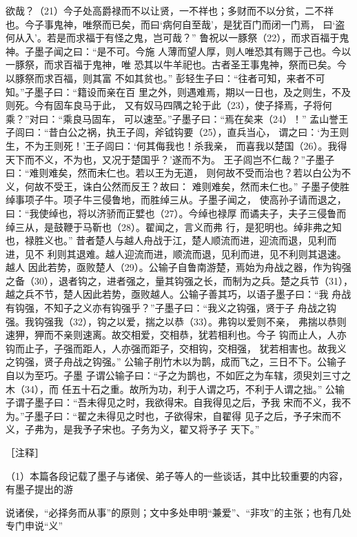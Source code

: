 \documentclass[12pt,UTF8]{ctexbook}
\begin{document}
欲哉？（21）今子处高爵禄而不以让贤，一不祥也；多财而不以分贫，二不祥 
也。今子事鬼神，唯祭而已矣，而曰‘病何自至哉’，是犹百门而闭一门焉， 
曰‘盗何从入’。若是而求福于有怪之鬼，岂可哉？” 
鲁祝以一豚祭（22），而求百福于鬼神。子墨子闻之曰：“是不可。今施 
人薄而望人厚，则人唯恐其有赐于己也。今以一豚祭，而求百福于鬼神，唯 
恐其以牛羊祀也。古者圣王事鬼神，祭而已矣。今以豚祭而求百福，则其富 
不如其贫也。” 
彭轻生子曰：“往者可知，来者不可知。”子墨子曰：“籍设而亲在百 
里之外，则遇难焉，期以一日也，及之则生，不及则死。今有固车良马于此， 
又有奴马四隅之轮于此（23），使子择焉，子将何乘？”对曰：“乘良马固车， 
可以速至。”子墨子曰：“焉在矣来（24）！” 
孟山誉王子闾曰：“昔白公之祸，执王子闾，斧钺钩要（25），直兵当心， 
谓之曰：‘为王则生，不为王则死！’王子闾曰：‘何其侮我也！杀我亲， 
而喜我以楚国（26）。我得天下而不义，不为也，又况于楚国乎？’遂而不为。 
王子闾岂不仁哉？”子墨子曰：“难则难矣，然而未仁也。若以王为无道， 
则何故不受而治也？若以白公为不义，何故不受王，诛白公然而反王？故曰： 
难则难矣，然而未仁也。” 
子墨子使胜绰事项子牛。项子牛三侵鲁地，而胜绰三从。子墨子闻之， 
使高孙子请而退之，曰：“我使绰也，将以济骄而正嬖也（27）。今绰也禄厚 
而谲夫子，夫子三侵鲁而绰三从，是鼓鞭于马靳也（28）。翟闻之，言义而弗 
行，是犯明也。绰非弗之知也，禄胜义也。” 
昔者楚人与越人舟战于江，楚人顺流而进，迎流而退，见利而进，见不 
利则其退难。越人迎流而进，顺流而退，见利而进，见不利则其退速。越人 
因此若势，亟败楚人（29）。公输子自鲁南游楚，焉始为舟战之器，作为钩强 
之备（30），退者钩之，进者强之，量其钩强之长，而制为之兵。楚之兵节（31）， 
越之兵不节，楚人因此若势，亟败越人。公输子善其巧，以语子墨子曰：“我 
舟战有钩强，不知子之义亦有钩强乎？”子墨子曰：“我义之钩强，贤于子 
舟战之钩强。我钩强我（32），钩之以爱，揣之以恭（33）。弗钩以爱则不亲， 
弗揣以恭则速狎，狎而不亲则速离。故交相爱，交相恭，犹若相利也。今子 
钩而止人，人亦钩而止子，子强而距人，人亦强而距子，交相钩，交相强， 
犹若相害也。故我义之钩强，贤子舟战之钩强。” 
公输子削竹木以为鹊，成而飞之，三日不下。公输子自以为至巧。子墨 
子谓公输子曰：“子之为鹊也，不如匠之为车辖，须臾刘三寸之木（34），而 
任五十石之重。故所为功，利于人谓之巧，不利于人谓之拙。” 
公输子谓子墨子曰：“吾未得见之时，我欲得宋。自我得见之后，予我 
宋而不义，我不为。”子墨子曰：“翟之未得见之时也，子欲得宋，自翟得 
见子之后，予子宋而不义，子弗为，是我予子宋也。子务为义，翟又将予子 
天下。” 


［注释］ 

（1）本篇各段记载了墨子与诸侯、弟子等人的一些谈话，其中比较重要的内容，有墨子提出的游 

说诸侯，“必择务而从事”的原则；文中多处申明“兼爱”、“非攻”的主张；也有几处专门申说“义” 
\end{document}
